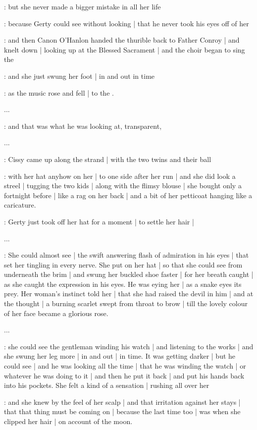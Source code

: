 \gertyJudgy:
but she never made a bigger mistake in all her life

\gertySex:
because Gerty could see without looking |
that he never took his eyes off of her

\Nrelig:
and then Canon O'Hanlon
handed the thurible
back to Father Conroy |
and knelt down |
looking up at the Blessed Sacrament |
and the choir
began to sing the 

\gertySex:
and she just swung her foot |
in and out in time

\Nrelig:
as the music rose and fell |
to the .

...

\gertySex:
and that was what he was looking at,
transparent,

...

:
Cissy came up along the strand |
with the two twins
and their ball

\gertyJudgy:
with her hat anyhow on her |
to one side after her run |
and she did look a streel |
tugging the two kids |
along with the flimsy blouse |
she bought only a fortnight before |
like a rag on her back |
and a bit of her petticoat
hanging like a caricature.

\gertyNovel:
Gerty just took off her hat for a moment |
to settle her hair |

...

\gertySex:
She could almost see |
the swift answering flash of admiration in his eyes |
that set her tingling
in every nerve.
She put on her hat |
so that she could see from underneath
the brim |
and swung her buckled shoe faster |
for her breath caught |
as she caught the expression
in his eyes.
He was eying her |
as a snake eyes its prey.
Her woman's instinct told her |
that she had raised the devil in him |
and at the thought |
a burning scarlet
swept from throat to brow |
till the lovely colour of her face
became a glorious rose.%

...

\gertySex:
she could see the gentleman
winding his watch |
and listening to the works |
and she swung her leg more |
in and out |
in time.
It was getting darker |
but he could see |
and he was looking all the time |
that he was winding the watch |
or whatever he was doing to it |
and then he put it back |
and put his hands back into his pockets.%
She felt a kind of a sensation |
rushing all over her

\gertyReal:
and she knew by the feel of her scalp |
and that irritation against her stays |
that that thing must be coming on |
because the last time too |
was when she clipped her hair |
on account of the moon.

